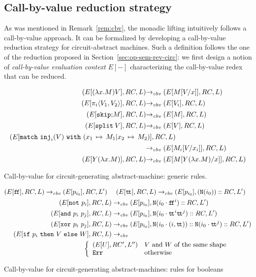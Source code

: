 \documentclass{article}
\theoremstyle{plain}
\theoremstyle{definition}
\newcommand{\cnotgate}[2]{{\tt N}({#1}\cdot{#2})}
\newcommand{\notgate}[1]{{\tt N}({#1})}
\newcommand{\punit}{\mathtt{skip}}\newcommand{\prodterm}[1]{{\langle{#1}\rangle}}
\newcommand{\letunitterm}[2]{{#1}\mathtt{;}{#2}}
\newcommand{\ttrue}{\mathtt{t\!t}}
\newcommand{\ffalse}{\mathtt{f\!f}}
\newcommand{\iftermx}[3]{{{\mathtt{if}}~{#1}~\mathtt{then}~{#2}~\mathtt{else}~{#3}}}
\newcommand{\inj}{{\tt inj}}
\newcommand{\match}[5]{{{\mathtt{match}}~{#1}~{\mathtt{with}}~({#2\,\mapsto\,#3}\vert{#4\,\mapsto\,#5})}}
\newcommand{\errorlist}{{\tt Err}}
\newcommand{\splitlist}[1][]{{\mathtt{split}^{#1}}}
\newcommand{\cbvam}{\mathrel{\to_{\it cbv}}}
\begin{document}
\subsection{Call-by-value reduction strategy}
\label{sec:cbv}

As was mentioned in Remark~\ref{rem:cbv}, the monadic lifting
intuitively follows a call-by-value approach. It can be formalized by
developing a call-by-value reduction strategy for circuit-abstract
machines.
Such a definition follows the one of the reduction proposed in
Section~\ref{sec:op-sem-rev-circ}: we first design a notion of {\em
  call-by-value evaluation context} $E[-]$ characterizing the
call-by-value redex that can be reduced.

\begin{table}
  \[\def\nl{\\[1ex]}
    \begin{array}{r@{}l}
    (E[(\lambda x.M)V], RC, L) &\cbvam (E[M{[}V/x{]}], RC, L)
    \nl
    (E[\pi_i\prodterm{V_1,V_2}], RC, L) &\cbvam (E[V_i], RC, L)
    \nl
    (E[\letunitterm{\punit}{M}], RC, L)
    &\cbvam (E[M], RC, L)
      \nl
    (E[\splitlist\,V], RC, L) &\cbvam (E[V], RC, L)
                                \nl
   (E[\match{\inj_i(V)}{x_1}{M_1}{x_2}{M_2}], RC, L)
    \hspace{-10ex}\nl &\cbvam
    (E[M_i{[}V/x_i{]}], RC, L)
    \nl
    (E[Y(\lambda x.M)], RC, L)
    &\cbvam
    (E[M[Y(\lambda x.M)/x]], RC, L)
    \end{array}
  \]
  \vspace{-2ex}
  \caption{Call-by-value for circuit-generating abstract-machine:
    generic rules.}
  \label{tab:amcbv}
\end{table}

\begin{table}
  {\begin{align*}
  (E[\ffalse],RC,L)\cbvam(E[p_{i_0}], RC, L')
  ~~&~~
  (E[\ttrue],RC,L)\cbvam(E[p_{i_0}], (\notgate{i_0})::RC,
  L')
  \\
  (E[{\tt not}~p_i],RC,L)&\cbvam(E[p_{i_0}],\cnotgate{i_0}{\ffalse^i}::RC,
  L')
  \\
  (E[{\tt and}~p_i~p_j],RC,L)&\cbvam(E[p_{i_0}],
  \cnotgate{i_0}{\ttrue^i\ttrue^j} :: RC, L')
  \\
  (E[{\tt xor}~p_i~p_j],RC,L)&\cbvam(E[p_{i_0}],\cnotgate{i_0}{(i,\ttrue)}::
  \cnotgate{i_0}{\ttrue^j}::RC, L')
  \\
  (E[\iftermx{p_i}{V}{W}], RC, L)&\cbvam
                                   \\
&\hspace{-10ex}
  \left\{
    \begin{array}{l@{\quad}l}
      (E[U], RC',L'') & \textrm{$V$ and $W$ of the same shape}
      \\
      \errorlist & \textrm{otherwise}
    \end{array}\right.
  \end{align*}}
\caption{Call-by-value for circuit-generating abstract-machines: rules
for booleans}
\label{tab:cbv-abm}
\end{table}
\end{document}
